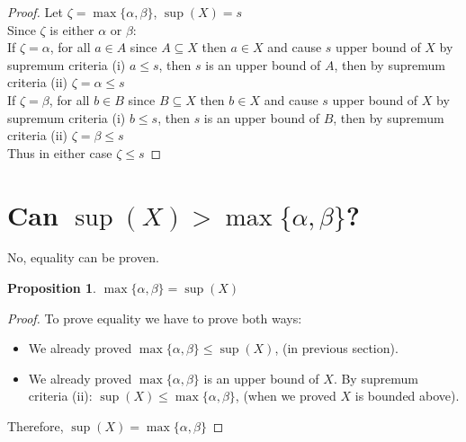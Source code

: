 \documentclass{article}
\newtheorem{proposition}{Proposition}
\begin{document}
\begin{proof}
Let $\zeta = \max\{\alpha,\beta\}$, $\sup(X) = s$\\
Since $\zeta$ is either $\alpha$ or $\beta$:\\
If $\zeta = \alpha$, for all $a \in A$ since $A \subseteq X$ then $a \in X$ and cause $s$ upper bound of $X$ by supremum criteria (i) $a \leq s$, then $s$ is an upper bound of $A$, then by supremum criteria (ii) $\zeta = \alpha \leq s$\\
If $\zeta = \beta$, for all $b \in B$ since $B \subseteq X$ then $b \in X$ and cause $s$ upper bound of $X$ by supremum criteria (i) $b \leq s$, then $s$ is an upper bound of $B$, then by supremum criteria (ii) $\zeta = \beta \leq s$\\
Thus in either case $\zeta \leq s$
\end{proof}

\section{Can $\sup(X) > \max\{\alpha,\beta\}$?}
No, equality can be proven.
\begin{proposition}
$\max\{\alpha,\beta\} = \sup(X)$
\end{proposition}
\begin{proof}To prove equality we have to prove both ways:
\begin{itemize}
	\item We already proved $\max\{\alpha,\beta\} \leq \sup(X)$, (in previous section).
	\item We already proved $\max\{\alpha,\beta\}$ is an upper bound of $X$. By supremum criteria (ii): $\sup(X) \leq \max\{\alpha,\beta\}$, (when we proved $X$ is bounded above).
\end{itemize}
Therefore, $\sup(X) = \max\{\alpha,\beta\}$
\end{proof}
\end{document}
